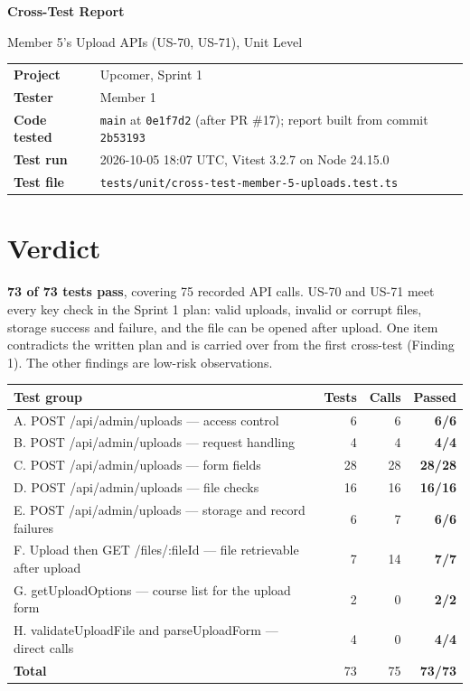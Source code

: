 \documentclass[10pt,a4paper]{article}
\begin{document}
{\color{brand}\Huge\bfseries Cross-Test Report\par}
\vspace{2pt}
{\Large Member 5's Upload APIs (US-70, US-71), Unit Level\par}
\vspace{8pt}
\begin{tabular}{@{}ll@{}}
\textbf{Project} & Upcomer, Sprint 1 \\
\textbf{Tester} & Member 1 \\
\textbf{Code tested} & \texttt{main} at \texttt{0e1f7d2} (after PR \#17); report built from commit \texttt{2b53193} \\
\textbf{Test run} & 2026-10-05 18:07 UTC, Vitest 3.2.7 on Node 24.15.0 \\
\textbf{Test file} & \texttt{tests/unit/cross-test-member-5-uploads.test.ts} \\
\end{tabular}

\section*{Verdict}
\textcolor{passgreen}{\textbf{73 of 73 tests pass}}, covering 75 recorded API calls. US-70 and US-71 meet every key check in the Sprint 1 plan: valid uploads, invalid or corrupt files, storage success and failure, and the file can be opened after upload. One item contradicts the written plan and is carried over from the first cross-test (Finding 1). The other findings are low-risk observations.

\begin{longtable}{@{}P{7.5cm}rrr@{}}
\toprule \textbf{Test group} & \textbf{Tests} & \textbf{Calls} & \textbf{Passed} \\ \midrule
A. POST /api/admin/uploads — access control & 6 & 6 & \textcolor{passgreen}{\textbf{6/6}} \\
B. POST /api/admin/uploads — request handling & 4 & 4 & \textcolor{passgreen}{\textbf{4/4}} \\
C. POST /api/admin/uploads — form fields & 28 & 28 & \textcolor{passgreen}{\textbf{28/28}} \\
D. POST /api/admin/uploads — file checks & 16 & 16 & \textcolor{passgreen}{\textbf{16/16}} \\
E. POST /api/admin/uploads — storage and record failures & 6 & 7 & \textcolor{passgreen}{\textbf{6/6}} \\
F. Upload then GET /files/:fileId — file retrievable after upload & 7 & 14 & \textcolor{passgreen}{\textbf{7/7}} \\
G. getUploadOptions — course list for the upload form & 2 & 0 & \textcolor{passgreen}{\textbf{2/2}} \\
H. validateUploadFile and parseUploadForm — direct calls & 4 & 0 & \textcolor{passgreen}{\textbf{4/4}} \\
\midrule \textbf{Total} & 73 & 75 & \textcolor{passgreen}{\textbf{73/73}} \\
\bottomrule
\end{longtable}
\end{document}
